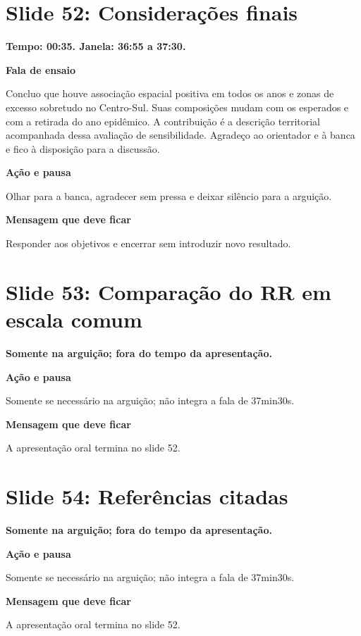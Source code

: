\documentclass[11pt,a4paper]{article}
\newcommand{\bloco}[1]{\par\Needspace{3\baselineskip}\textbf{#1}\par}
\newcommand{\slide}[2]{\Needspace{13\baselineskip}\section*{Slide #1: #2}}
\begin{document}
\par\begin{minipage}{\textwidth}
\slide{52}{Considerações finais}
{\color{azul}\textbf{Tempo: 00:35. Janela: 36:55 a 37:30.}}\par
\bloco{Fala de ensaio}
Concluo que houve associação espacial positiva em todos os anos e zonas de excesso sobretudo no Centro-Sul. Suas composições mudam com os esperados e com a retirada do ano epidêmico. A contribuição é a descrição territorial acompanhada dessa avaliação de sensibilidade. Agradeço ao orientador e à banca e fico à disposição para a discussão.
\bloco{Ação e pausa}
Olhar para a banca, agradecer sem pressa e deixar silêncio para a arguição.
\bloco{Mensagem que deve ficar}
Responder aos objetivos e encerrar sem introduzir novo resultado.
\end{minipage}\par\bigskip
\par\begin{minipage}{\textwidth}
\slide{53}{Comparação do RR em escala comum}
{\color{azul}\textbf{Somente na arguição; fora do tempo da apresentação.}}\par
\bloco{Ação e pausa}
Somente se necessário na arguição; não integra a fala de 37min30s.
\bloco{Mensagem que deve ficar}
A apresentação oral termina no slide 52.
\end{minipage}\par\bigskip
\par\begin{minipage}{\textwidth}
\slide{54}{Referências citadas}
{\color{azul}\textbf{Somente na arguição; fora do tempo da apresentação.}}\par
\bloco{Ação e pausa}
Somente se necessário na arguição; não integra a fala de 37min30s.
\bloco{Mensagem que deve ficar}
A apresentação oral termina no slide 52.
\end{minipage}\par\bigskip
\end{document}
